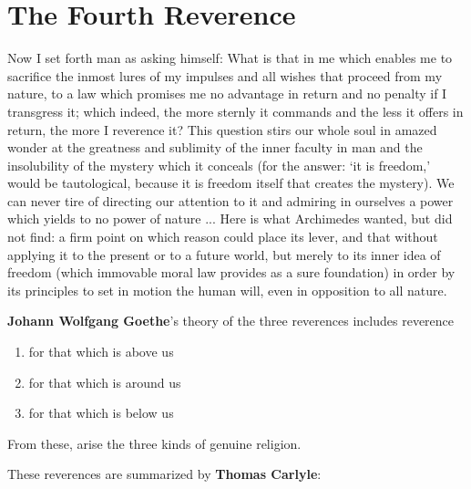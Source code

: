 \section{The Fourth Reverence}

\begin{quotex}
Now I set forth man as asking himself: What is that in me which enables me to sacrifice the inmost lures of my impulses and all wishes that proceed from my nature, to a law which promises me no advantage in return and no penalty if I transgress it; which indeed, the more sternly it commands and the less it offers in return, the more I reverence it? This question stirs our whole soul in amazed wonder at the greatness and sublimity of the inner faculty in man and the insolubility of the mystery which it conceals (for the answer: `it is freedom,' would be tautological, because it is freedom itself that creates the mystery). We can never tire of directing our attention to it and admiring in ourselves a power which yields to no power of nature ... Here is what Archimedes wanted, but did not find: a firm point on which reason could place its lever, and that without applying it to the present or to a future world, but merely to its inner idea of freedom (which immovable moral law provides as a sure foundation) in order by its principles to set in motion the human will, even in opposition to all nature.
\end{quotex}


\textbf{Johann Wolfgang Goethe}'s theory of the three reverences includes reverence

\begin{enumerate}


\item for that which is above us

\item for that which is around us

\item for that which is below us
\end{enumerate}


From these, arise the three kinds of genuine religion.

These reverences are summarized by \textbf{Thomas Carlyle}:

